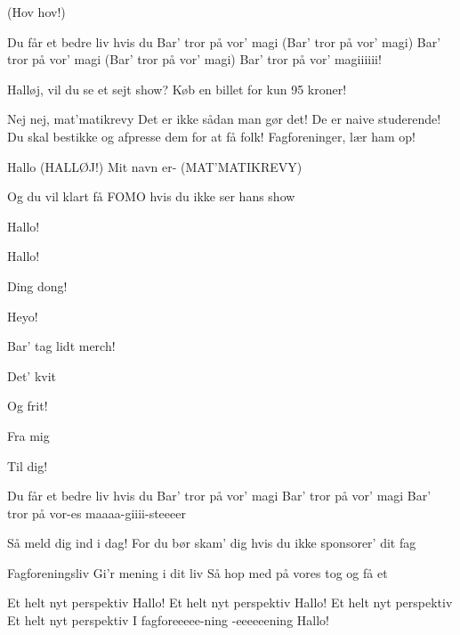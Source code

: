 \documentclass[a4paper,11pt]{article}
\begin{document}
\begin{song}
%
(Hov hov!)

%
Du får et bedre liv hvis du
Bar’ tror på vor’ magi
(Bar’ tror på vor’ magi)
Bar’ tror på vor’ magi
(Bar’ tror på vor’ magi)
Bar’ tror på vor’ magiiiiii!


%
Halløj, vil du se et sejt show?
Køb en billet for kun 95 kroner!

%
Nej nej, mat’matikrevy
Det er ikke sådan man gør det!
De er naive studerende!
Du skal bestikke og afpresse dem for at få folk!
Fagforeninger, lær ham op!

%
Hallo
(HALLØJ!)
Mit navn er- (MAT’MATIKREVY)

%
Og du vil klart få FOMO hvis du ikke ser hans show

%
Hallo!

%
Hallo!

%
Ding dong!

%
Heyo!

%
Bar’ tag lidt merch!

%
Det' kvit

%
Og frit!

%
Fra mig

%
Til dig!

%
Du får et bedre liv hvis du
Bar’ tror på vor’ magi
Bar’ tror på vor’ magi
Bar’ tror på vor-es maaaa-giiii-steeeer 

%
Så meld dig ind i dag!
For du bør skam’ dig hvis du ikke sponsorer’ dit fag

%
Fagforeningsliv
Gi’r mening i dit liv
Så hop med på vores tog og få et

%
Et helt nyt perspektiv
Hallo!
Et helt nyt perspektiv
Hallo!
Et helt nyt perspektiv
Et helt nyt perspektiv
I fagforeeeee-ning
-eeeeeening
Hallo!

\end{song}
\end{document}
